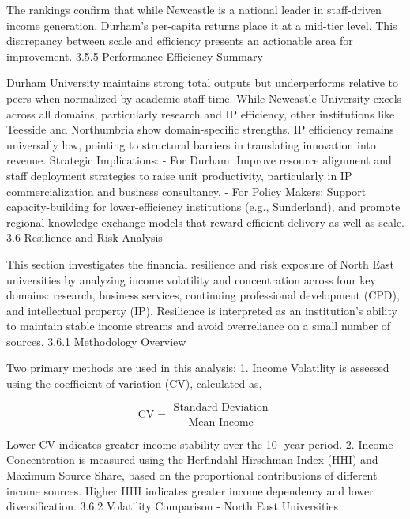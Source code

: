 The rankings confirm that while Newcastle is a national leader in staff-driven income generation, Durham's per-capita returns place it at a mid-tier level. This discrepancy between scale and efficiency presents an actionable area for improvement.
3.5.5 Performance Efficiency Summary

Durham University maintains strong total outputs but underperforms relative to peers when normalized by academic staff time. While Newcastle University excels across all domains, particularly research and IP efficiency, other institutions like Teesside and Northumbria show domain-specific strengths. IP efficiency remains universally low, pointing to structural barriers in translating innovation into revenue. Strategic Implications:
- For Durham: Improve resource alignment and staff deployment strategies to raise unit productivity, particularly in IP commercialization and business consultancy.
- For Policy Makers: Support capacity-building for lower-efficiency institutions (e.g., Sunderland), and promote regional knowledge exchange models that reward efficient delivery as well as scale.
3.6 Resilience and Risk Analysis

This section investigates the financial resilience and risk exposure of North East universities by analyzing income volatility and concentration across four key domains: research, business services, continuing professional development (CPD), and intellectual property (IP). Resilience is interpreted as an institution's ability to maintain stable income streams and avoid overreliance on a small number of sources.
3.6.1 Methodology Overview

Two primary methods are used in this analysis:
1. Income Volatility is assessed using the coefficient of variation (CV), calculated as,

$$
\mathrm{CV}=\frac{\text { Standard Deviation }}{\text { Mean Income }}
$$


Lower CV indicates greater income stability over the 10 -year period.
2. Income Concentration is measured using the Herfindahl-Hirschman Index (HHI) and Maximum Source Share, based on the proportional contributions of different income sources. Higher HHI indicates greater income dependency and lower diversification.
3.6.2 Volatility Comparison - North East Universities

